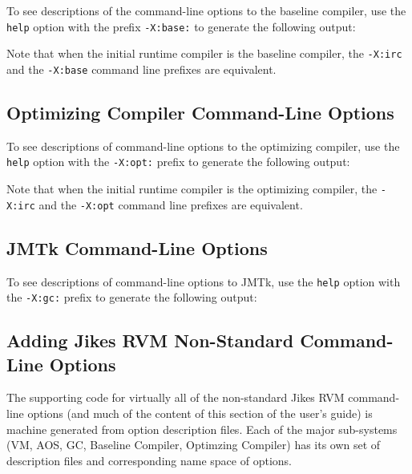 To see descriptions of the command-line options to the baseline
compiler, use the {\tt help} option with the prefix {\tt -X:base:} 
to generate the following output:

\T \begin{small}

\T \end{small}
 
Note that when the initial runtime compiler is the baseline compiler, 
the {\tt -X:irc} and the {\tt -X:base} command line prefixes are equivalent.

\subsection{Optimizing Compiler Command-Line Options}
\label{section:nonadaptive:optimizing:options}

To see descriptions of command-line options to the optimizing compiler,
use the {\tt help} option with the {\tt -X:opt:} prefix 
to generate the following output:

\T \begin{tiny}

\T \end{tiny}

Note that when the initial runtime compiler is the optimizing compiler, 
the {\tt -X:irc} and the {\tt -X:opt} command line prefixes are equivalent.

\subsection{JMTk Command-Line Options}
\label{section:mmtkoptions}

To see descriptions of command-line options to JMTk,
use the {\tt help} option with the {\tt -X:gc:} prefix 
to generate the following output:

\T \begin{tiny}

\T \end{tiny}

\subsection{Adding Jikes RVM Non-Standard Command-Line Options}
The supporting code for virtually all of the non-standard
Jikes\TMweb{} RVM command-line options (and much of the content of
this section of the user's guide) is machine generated from
option description files.  Each of the major sub-systems (VM, AOS, GC,
Baseline Compiler, Optimzing Compiler) has its own set of description
files and corresponding name space of options. 

